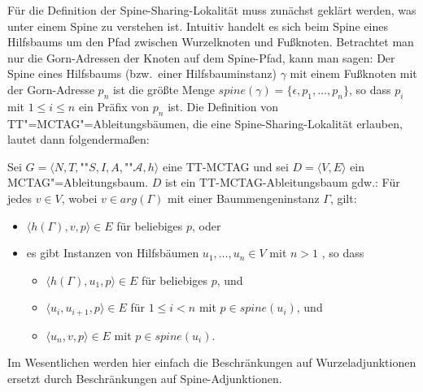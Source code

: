 Für die Definition der Spine-Sharing-Lokalität muss zunächst geklärt werden, was unter einem Spine zu verstehen ist. Intuitiv handelt es sich beim Spine eines Hilfsbaums um den Pfad zwischen Wurzelknoten und Fu\ss knoten. Betrachtet man nur die Gorn-Adressen der Knoten auf dem Spine-Pfad, kann man sagen: Der Spine eines Hilfsbaums (bzw.\ einer Hilfsbauminstanz) $\gamma$ mit einem Fu\ss knoten mit der Gorn-Adresse $p_n$ ist die größte Menge $spine(\gamma) = \{ \epsilon , p_1 , \ldots, p_n \}$, so dass $p_i$ mit $1 \leq i \leq n$ ein Präfix von $p_n$ ist. Die Definition von TT"=MCTAG"=Ableitungsbäumen, die eine Spine-Sharing-Lokalität erlauben, lautet dann folgenderma\ss en:
\begin{definition}
Sei $G = \langle N,T,$""$S,I,A,$""$\mathcal{A},h \rangle$ eine TT-MCTAG und sei $D = \langle V,E \rangle$ ein MCTAG"=Ableitungsbaum. $D$ ist ein TT-MCTAG-Ablei\-tungs\-baum gdw.:
Für jedes $v \in V$, wobei $v \in arg(\Gamma)$ mit einer Baummengeninstanz $\Gamma$, gilt:
\begin{itemize} 
  \item $\langle h(\Gamma),v,p \rangle \in E$ für beliebiges $p$, oder
  \item es gibt Instanzen von Hilfsbäumen $u_1, \ldots, u_n \in V$ mit $n>1$ , so dass
  \begin{itemize}
    \item $\langle h(\Gamma),u_1,p \rangle \in E$ für beliebiges $p$, und
    \item $\langle u_i,u_{i+1},p \rangle \in E$ für $1 \leq i < n$ mit $p \in spine(u_i)$, und
    \item $\langle u_n,v,p \rangle \in E$ mit $p \in spine(u_i)$.
  \end{itemize}
\end{itemize}  
\end{definition}
Im Wesentlichen werden hier einfach die Beschränkungen auf Wurzeladjunktionen ersetzt durch Beschränkungen auf Spine-Adjunktionen.

